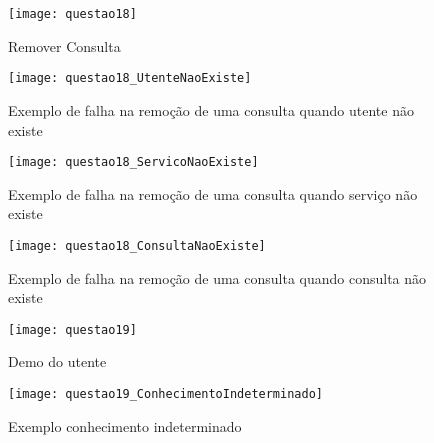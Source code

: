       \begin{minipage}{\linewidth}
      	\centering
      	\begin{minipage}{0.45\linewidth}
      		\begin{figure}[H]
      			\texttt{[image: questao18]}
      			\caption{Remover Consulta}
      		\end{figure}
      	\end{minipage}
      	\hspace{0.05\linewidth}
      	\begin{minipage}{0.45\linewidth}
      		\begin{figure}[H]
      			\texttt{[image: questao18\_UtenteNaoExiste]}
      			\caption{Exemplo de falha na remoção de uma consulta quando utente não existe}
      		\end{figure}
      	\end{minipage}
      	\begin{minipage}{0.45\linewidth}
      		\begin{figure}[H]
      			\texttt{[image: questao18\_ServicoNaoExiste]}
      			\caption{Exemplo de falha na remoção de uma consulta quando serviço não existe}
      		\end{figure}
      	\end{minipage}
      	\begin{minipage}{0.45\linewidth}
      	\begin{figure}[H]
      		\texttt{[image: questao18\_ConsultaNaoExiste]}
      		\caption{Exemplo de falha na remoção de uma consulta quando consulta não existe}
      	\end{figure}
      \end{minipage}
      \end{minipage}
      
      
  \begin{minipage}{\linewidth}
  	\centering
  	\begin{minipage}{0.45\linewidth}
  		\begin{figure}[H]
  			\texttt{[image: questao19]}
  			\caption{Demo do utente}
  		\end{figure}
  	\end{minipage}
  	\hspace{0.05\linewidth}
  	\begin{minipage}{0.45\linewidth}
  		\begin{figure}[H]
  			\texttt{[image: questao19\_ConhecimentoIndeterminado]}
  			\caption{Exemplo conhecimento indeterminado}
  		\end{figure}
  	\end{minipage}
  \end{minipage}
      



